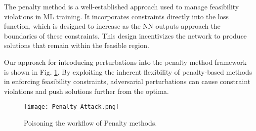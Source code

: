 

The penalty method is a well-established approach used to manage feasibility violations in ML training. It incorporates constraints directly into the loss function, which is designed to increase as the NN outputs approach the boundaries of these constraints. This design incentivizes the network to produce solutions that remain within the feasible region.

Our approach for introducing perturbations into the penalty method framework is shown in Fig. \ref{penfig}. By exploiting the inherent flexibility of penalty-based methods in enforcing feasibility constraints, adversarial perturbations can cause constraint violations and push solutions further from the optima.

\begin{figure}[h!]
\centerline{\texttt{[image: Penalty\_Attack.png]}}
\vspace{-.2cm}
\caption{Poisoning the workflow of Penalty methods. 
}
\label{penfig}
\end{figure}